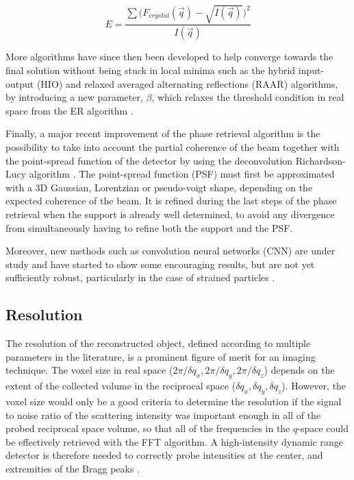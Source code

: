 \begin{equation}
    \label{eq:MSE}
    E = \frac{\sum \big( F_{crystal}(\vec{q}) - \sqrt{I(\vec{q})}  \big)^2}{I(\vec{q})}
\end{equation}

More algorithms have since then been developed to help converge towards the final solution without being stuck in local minima such as the hybrid input-output (HIO) and relaxed averaged alternating reflections (RAAR) algorithms, by introducing a new parameter, $\beta$, which relaxes the threshold condition in real space from the ER algorithm \parencite{Marchesini2003, Luke2005, Marchesini2007}.

Finally, a major recent improvement of the phase retrieval algorithm is the possibility to take into account the partial coherence of the beam \parencite{Sinha1998, Vartanyants2001, Williams2007, Whitehead2009, Nugent2010, ChenBo2012} together with the point-spread function of the detector by using the deconvolution Richardson-Lucy algorithm \parencite{Richardson1972, Lucy1974, Fish1995, Clark2012}.
The point-spread function (PSF) must first be approximated with a 3D Gaussian, Lorentzian or pseudo-voigt shape, depending on the expected coherence of the beam.
It is refined during the last steps of the phase retrieval when the support is already well determined, to avoid any divergence from simultaneously having to refine both the support and the PSF.

Moreover, new methods such as convolution neural networks (CNN) are under study and have started to show some encouraging results, but are not yet sufficiently robust, particularly in the case of strained particles \parencite{Cherukara2018, Shen2019, Chan2021, Kim2021a, Wu2021a}.

\subsection{Resolution}

The resolution of the reconstructed object, defined according to multiple parameters in the literature, is a prominent figure of merit for an imaging technique.
The voxel size in real space ($2\pi / \delta q_x, 2\pi / \delta q_y, 2\pi / \delta q_z$) depends on the extent of the collected volume in the reciprocal space ($\delta q_x, \delta q_y, \delta q_z$).
However, the voxel size would only be a good criteria to determine the resolution if the signal to noise ratio of the scattering intensity was important enough in all of the probed reciprocal space volume, so that all of the frequencies in the $q$-space could be effectively retrieved with the FFT algorithm.
A high-intensity dynamic range detector is therefore needed to correctly probe intensities at the center, and extremities of the Bragg peaks \parencite{Latychevskaia2018}.

